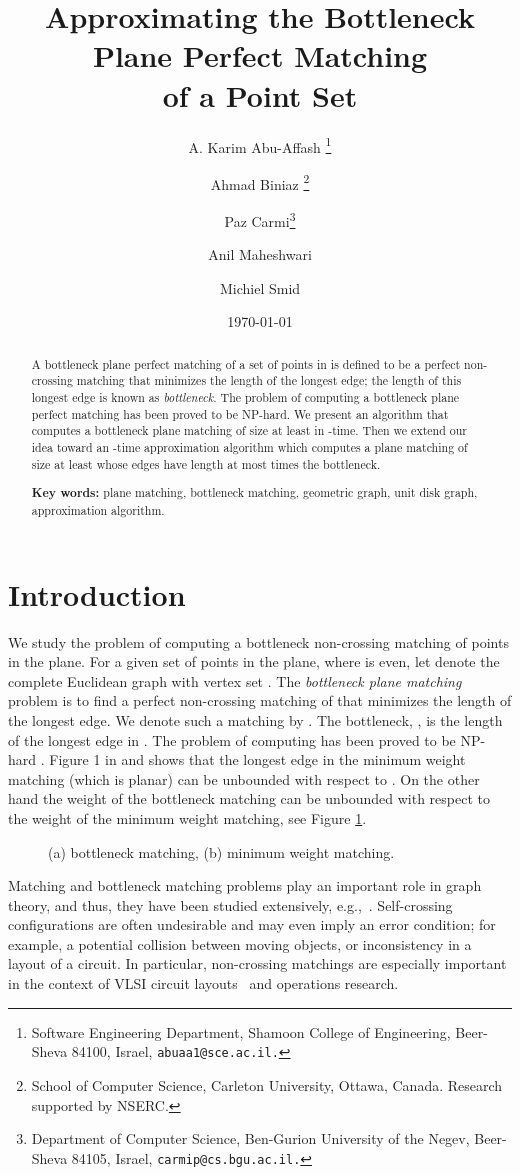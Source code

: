 \documentclass[11pt,a4paper]{article}
\title{Approximating the Bottleneck Plane Perfect Matching\\of a Point Set}
\author{
A. Karim Abu-Affash \thanks{Software Engineering Department, Shamoon College of Engineering, Beer-Sheva 84100, Israel, {\tt abuaa1@sce.ac.il.}} 
\and 
Ahmad Biniaz
\thanks{School of Computer Science, Carleton University, 
                    Ottawa, Canada. Research supported by NSERC.}
\and 
Paz Carmi\thanks{Department of Computer Science, Ben-Gurion University of the Negev, Beer-Sheva 84105, Israel, {\tt carmip@cs.bgu.ac.il.}}
\and
Anil Maheshwari\footnotemark[2]
\and 
Michiel Smid\footnotemark[2]
}
\date{\today}
\begin{document}
\maketitle

\begin{abstract}
A bottleneck plane perfect matching of a set of  points in  is defined to be a perfect non-crossing matching that minimizes the length of the longest edge; the length of this longest edge is known as {\em bottleneck}. The problem of computing a bottleneck plane perfect matching has been proved to be NP-hard. 
We present an algorithm that computes a bottleneck plane matching of size at least  in -time.
Then we extend our idea toward an -time approximation algorithm which computes a plane matching of size at least  whose edges have length at most  times the bottleneck.

{\bf Key words:} plane matching, bottleneck matching, geometric graph, unit disk graph, approximation algorithm.

\end{abstract}


\section{Introduction}
We study the problem of computing a bottleneck non-crossing matching of points in the plane.
For a given set  of  points in the plane, where  is even, let  denote the complete Euclidean graph with vertex set . The {\em bottleneck plane matching} problem is to find a perfect non-crossing matching of  that minimizes the length of the longest edge. We denote such a matching by . The bottleneck, , is the length of the longest edge in . The problem of computing  
has been proved to be NP-hard \cite{Abu-Affash2014}. 
Figure 1 in \cite{Abu-Affash2014} and \cite{Carlsson2010} shows that the longest edge in the minimum weight matching (which is planar) can be unbounded with respect to . On the other hand the weight of the bottleneck matching can be unbounded with respect to the weight of the minimum weight matching, see Figure \ref{weight}.

\begin{figure}[ht]
  \centering
\setlength{\tabcolsep}{0in}
  
  \caption{(a) bottleneck matching, (b) minimum weight matching.}
\label{weight}
\end{figure}

Matching and bottleneck matching problems play an important role in graph theory, and thus, they have been studied extensively,  e.g.,~\cite{Abu-Affash2014, Aloupis2013, Chang1992, Efrat2001, Efrat2000, Vaidya1989, Varadarajan1998}. Self-crossing configurations are often undesirable and may even imply an error condition; for example, a potential collision between moving objects, or inconsistency in a layout of a circuit.
In particular, non-crossing matchings are especially important in the context of VLSI circuit layouts~\cite{Lengauer1990} and operations research.
\end{document}

